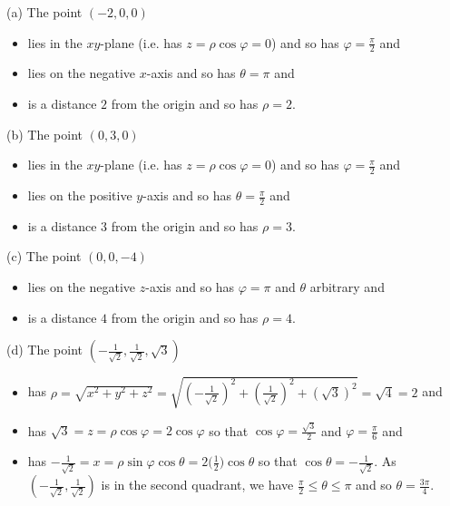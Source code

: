 \begin{solution}
(a) The point $(-2,0,0)$
\begin{itemize}
\item 
lies in the $xy$-plane (i.e. has $z=\rho\cos\varphi=0$) and so has $\varphi=\frac{\pi}{2}$ and
\item
lies on the negative $x$-axis and so has $\theta=\pi$ and
\item
is a distance $2$ from the origin and so has $\rho=2$.
\end{itemize}

(b) The point $(0,3,0)$
\begin{itemize}
\item 
lies in the $xy$-plane (i.e. has $z=\rho\cos\varphi=0$) and so has $\varphi=\frac{\pi}{2}$ and
\item
lies on the positive $y$-axis and so has $\theta=\frac{\pi}{2}$ and
\item
is a distance $3$ from the origin and so has $\rho=3$.
\end{itemize}

(c) The point $(0,0,-4)$
\begin{itemize}
\item
lies on the negative $z$-axis and so has $\varphi=\pi$ and $\theta$ arbitrary
and
\item
is a distance $4$ from the origin and so has $\rho=4$.
\end{itemize}

(d) The point $\left(-\frac{1}{\sqrt{2}},\frac{1}{\sqrt{2}},\sqrt{3}\right)$
\begin{itemize}
\item
has $\rho=\sqrt{x^2+y^2+z^2}
       =\sqrt{\left(-\frac{1}{\sqrt{2}}\right)^2
               +\left(\frac{1}{\sqrt{2}}\right)^2
               +\left(\sqrt{3}\right)^2}=\sqrt{4}=2$
and
\item
has $\sqrt{3}=z=\rho\cos\varphi = 2\cos\varphi$ so that
$\cos\varphi = \frac{\sqrt{3}}{2}$ and $\varphi=\frac{\pi}{6}$
and
\item
has $-\frac{1}{\sqrt{2}}=x=\rho\sin\varphi\cos\theta 
= 2\big(\frac{1}{2}\big)\cos\theta$ 
so that $\cos\theta = -\frac{1}{\sqrt{2}}$. As 
$\left(-\frac{1}{\sqrt{2}},\frac{1}{\sqrt{2}}\right)$ is in the second
quadrant, we have $\frac{\pi}{2}\le\theta\le\pi$ and so 
$\theta=\frac{3\pi}{4}$.  

\end{itemize}

\end{solution}


